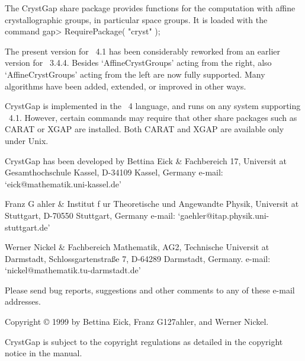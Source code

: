 
The CrystGap share package provides functions for the computation 
with affine crystallographic groups, in particular space groups.  
It is loaded with the command
\beginexample 
     gap> RequirePackage( "cryst" ); 
\endexample

The present version for {\GAP}~4.1 has been considerably reworked 
from an earlier version for {\GAP}~3.4.4. Besides `AffineCrystGroups'
acting from the right, also `AffineCrystGroups' acting from the 
left are now fully supported. Many algorithms have been added,
extended, or improved in other ways.

CrystGap is implemented in the {\GAP}~4 language, and runs on any 
system supporting {\GAP}~4.1. However, certain commands may require 
that other share packages such as CARAT or XGAP are installed. 
Both CARAT and XGAP are available only under Unix.

CrystGap has been developed by
\beginitems
Bettina Eick &
Fachbereich 17,
Universit{ a}t Gesamthochschule Kassel,
D-34109 Kassel, Germany \hfill\break 
e-mail: `eick@mathematik.uni-kassel.de'

Franz G{ a}hler &
Institut f{ u}r Theoretische und Angewandte Physik,\hfil\break
Universit{ a}t Stuttgart,
D-70550 Stuttgart, Germany \hfill\break
e-mail: `gaehler@itap.physik.uni-stuttgart.de'

Werner Nickel &
Fachbereich Mathematik, AG2,
Technische Universit{ a}t Darmstadt, \hfill\break
Schlossgartenstra{\ss}e 7, D-64289 Darmstadt, Germany. \hfil\break
e-mail: `nickel@mathematik.tu-darmstadt.de'
\enditems

Please send bug reports, suggestions and other comments to any of these
e-mail addresses.

\vfill
Copyright {\copyright} 1999 
by Bettina Eick, Franz G\accent127ahler, and Werner Nickel.

\smallskip
CrystGap is subject to the {\GAP} copyright regulations as 
detailed in the copyright notice in the {\GAP} manual.






